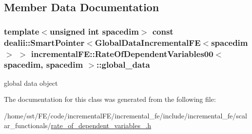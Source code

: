 \subsection{Member Data Documentation}
\subsubsection[{\texorpdfstring{global\+\_\+data}{global_data}}]{\setlength{\rightskip}{0pt plus 5cm}template$<$unsigned int spacedim$>$ const dealii\+::\+Smart\+Pointer$<${\bf Global\+Data\+Incremental\+FE}$<$spacedim$>$ $>$ {\bf incremental\+F\+E\+::\+Rate\+Of\+Dependent\+Variables00}$<$ spacedim, spacedim $>$\+::global\+\_\+data\hspace{0.3cm}{\ttfamily [private]}}\hypertarget{classincremental_f_e_1_1_rate_of_dependent_variables00_3_01spacedim_00_01spacedim_01_4_af139a3e4d382d268ec402515a6d98b85}{}\label{classincremental_f_e_1_1_rate_of_dependent_variables00_3_01spacedim_00_01spacedim_01_4_af139a3e4d382d268ec402515a6d98b85}
global data object 

The documentation for this class was generated from the following file\+:\begin{DoxyCompactItemize}
\item 
/home/sst/\+F\+E/code/incremental\+F\+E/incremental\+\_\+fe/include/incremental\+\_\+fe/scalar\+\_\+functionals/\hyperlink{rate__of__dependent__variables__00_8h}{rate\+\_\+of\+\_\+dependent\+\_\+variables\+\_.\+h}\end{DoxyCompactItemize}
